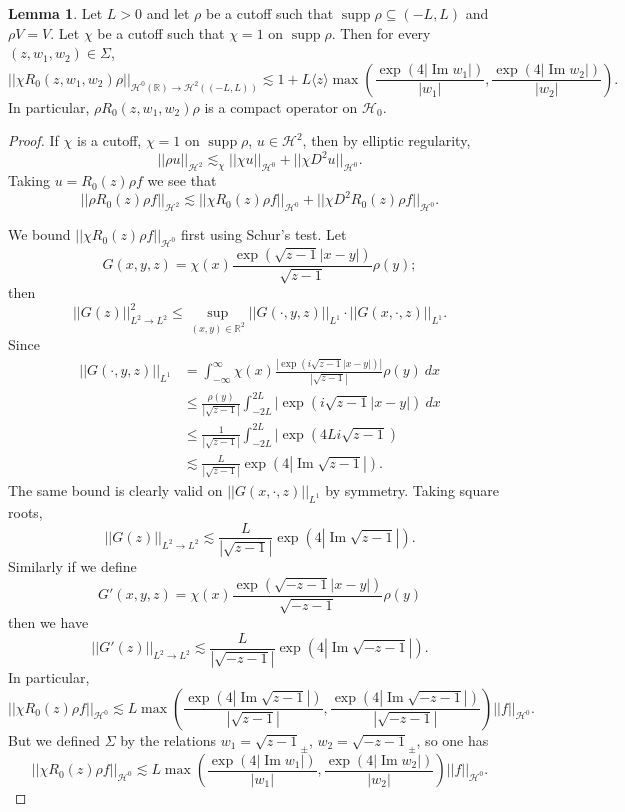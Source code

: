 \documentclass[12pt]{report}
\newcommand{\RR}{\mathbb{R}}
\DeclareMathOperator{\supp}{supp}
\renewcommand{\Im}{\operatorname{Im}}
\theoremstyle{definition}
\newtheorem{lemma}[theorem]{Lemma}
\begin{document}
\begin{lemma}
\label{exponential bound on free resolvent}
Let $L > 0$ and let $\rho$ be a cutoff such that $\supp \rho \subseteq (-L, L)$ and $\rho V = V$.
Let $\chi$ be a cutoff such that $\chi = 1$ on $\supp \rho$.
Then for every $(z, w_1, w_2) \in \Sigma$,
$$||\chi R_0(z, w_1, w_2) \rho||_{\mathcal H^0(\RR) \to \mathcal H^2((-L, L))} \lesssim 1 + L\langle z\rangle\max\left(\frac{\exp(4 |\Im w_1|)}{|w_1|}, \frac{\exp(4 |\Im w_2|)}{|w_2|} \right).$$
In particular, $\rho R_0(z, w_1, w_2) \rho$ is a compact operator on $\mathcal H_0$.
\end{lemma}
\begin{proof}
If $\chi$ is a cutoff, $\chi = 1$ on $\supp \rho$, $u \in \mathcal H^2$, then by elliptic regularity,
$$||\rho u||_{\mathcal H^2} \lesssim_\chi ||\chi u||_{\mathcal H^0} + ||\chi D^2 u||_{\mathcal H^0}.$$
Taking $u = R_0(z)\rho f$ we see that
$$||\rho R_0(z)\rho f||_{\mathcal H^2} \lesssim ||\chi R_0(z) \rho f||_{\mathcal H^0} + ||\chi D^2 R_0(z) \rho f||_{\mathcal H^0}.$$

We bound $||\chi R_0(z) \rho f||_{\mathcal H^0}$ first using Schur's test. Let
$$G(x, y, z) = \chi(x) \frac{\exp(\sqrt{z-1}|x-y|)}{\sqrt{z-1}} \rho(y);$$
then
$$||G(z)||_{L^2 \to L^2}^2 \leq \sup_{(x, y) \in \RR^2} ||G(\cdot, y, z)||_{L^1}\cdot||G(x, \cdot, z)||_{L^1}.$$
Since
\begin{align*}
||G(\cdot, y, z)||_{L^1} &= \int_{-\infty}^\infty \chi(x) \frac{|\exp(i\sqrt{z-1}|x-y|)|}{|\sqrt{z-1}|}\rho(y)~dx\\
&\leq \frac{\rho(y)}{|\sqrt{z-1}|} \int_{-2L}^{2L} |\exp(i\sqrt{z-1}|x-y|)~dx\\
&\leq \frac{1}{|\sqrt{z-1}|} \int_{-2L}^{2L} |\exp(4Li\sqrt{z-1})\\
&\lesssim \frac{L}{|\sqrt{z-1}|} \exp(4 |\Im\sqrt{z-1}|).
\end{align*}
The same bound is clearly valid on $||G(x, \cdot, z)||_{L^1}$ by symmetry. Taking square roots,
$$||G(z)||_{L^2 \to L^2} \lesssim \frac{L}{|\sqrt{z-1}|} \exp(4 |\Im\sqrt{z-1}|).$$
Similarly if we define
$$G'(x, y, z) = \chi(x) \frac{\exp(\sqrt{-z-1}|x-y|)}{\sqrt{-z-1}} \rho(y)$$
then we have
$$||G'(z)||_{L^2 \to L^2} \lesssim \frac{L}{|\sqrt{-z-1}|} \exp(4 |\Im \sqrt{-z-1}|).$$
In particular,
$$||\chi R_0(z) \rho f||_{\mathcal H^0} \lesssim L \max\left(\frac{\exp(4 |\Im \sqrt{z-1}|)}{|\sqrt{z-1}|}, \frac{\exp(4 |\Im \sqrt{-z-1}|)}{|\sqrt{-z-1}|} \right) ||f||_{\mathcal H^0}.$$
But we defined $\Sigma$ by the relations $w_1 = \sqrt{z-1}_\pm$, $w_2 = \sqrt{-z-1}_\pm$, so one has
$$||\chi R_0(z) \rho f||_{\mathcal H^0} \lesssim L \max\left(\frac{\exp(4 |\Im w_1|)}{|w_1|}, \frac{\exp(4 |\Im w_2|)}{|w_2|} \right) ||f||_{\mathcal H^0}.$$


\end{proof}
\end{document}
